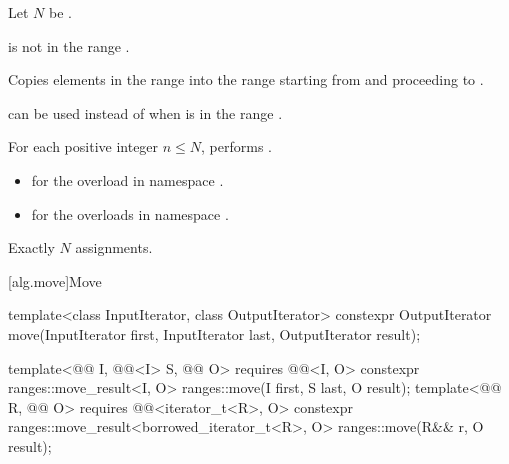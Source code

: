 \begin{itemdescr}
\pnum
Let $N$ be .

\pnum
\expects
{} is not in the range .

\pnum
\effects
Copies elements in the range 
into the range 
starting from  and proceeding to .
\begin{footnote}
 can be used instead of 
when  is in the range .
\end{footnote}
For each positive integer $n \le N$,
performs .

\pnum
\returns
\begin{itemize}
\item
  for the overload in namespace .
\item
  for the overloads in namespace .
\end{itemize}

\pnum
\complexity
Exactly $N$ assignments.
\end{itemdescr}

[alg.move]{Move}

%
\begin{itemdecl}
template<class InputIterator, class OutputIterator>
  constexpr OutputIterator move(InputIterator first, InputIterator last,
                                OutputIterator result);

template<@@ I, @@<I> S, @@ O>
  requires @@<I, O>
  constexpr ranges::move_result<I, O>
    ranges::move(I first, S last, O result);
template<@@ R, @@ O>
  requires @@<iterator_t<R>, O>
  constexpr ranges::move_result<borrowed_iterator_t<R>, O>
    ranges::move(R&& r, O result);
\end{itemdecl}

